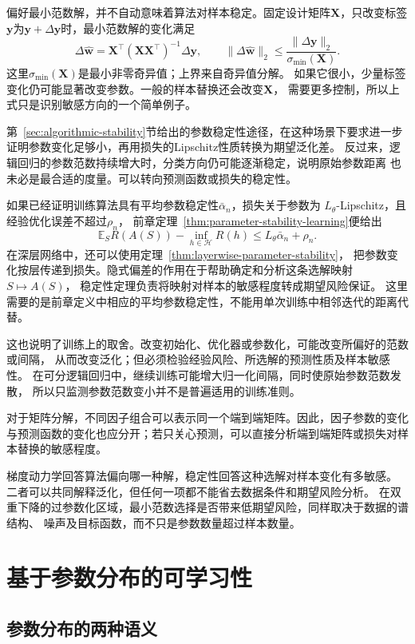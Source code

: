 偏好最小范数解，并不自动意味着算法对样本稳定。固定设计矩阵$\bm X$，只改变标签
$\bm y$为$\bm y+\Delta\bm y$时，最小范数解的变化满足
\[
 \Delta\hat{\bm w}=\bm X^\top(\bm X\bm X^\top)^{-1}\Delta\bm y,
 \qquad
 \|\Delta\hat{\bm w}\|_2\leq
 \frac{\|\Delta\bm y\|_2}{\sigma_{\min}(\bm X)}.
\]
这里$\sigma_{\min}(\bm X)$是最小非零奇异值；上界来自奇异值分解。
如果它很小，少量标签变化仍可能显著改变参数。一般的样本替换还会改变$\bm X$，
需要更多控制，所以上式只是识别敏感方向的一个简单例子。

第~\ref{sec:algorithmic-stability}节给出的参数稳定性途径，在这种场景下要求进一步
证明参数变化足够小，再用损失的Lipschitz性质转换为期望泛化差。
反过来，逻辑回归的参数范数持续增大时，分类方向仍可能逐渐稳定，说明原始参数距离
也未必是最合适的度量。可以转向预测函数或损失的稳定性。

如果已经证明训练算法具有平均参数稳定性$\bar\alpha_n$，损失关于参数为
$L_\theta$-Lipschitz，且经验优化误差不超过$\rho_n$，
前章定理~\ref{thm:parameter-stability-learning}便给出
\[
 \mathbb E_S R(A(S))-\inf_{h\in\mathcal H}R(h)
 \leq L_\theta\bar\alpha_n+\rho_n.
\]
在深层网络中，还可以使用定理~\ref{thm:layerwise-parameter-stability}，
把参数变化按层传递到损失。隐式偏差的作用在于帮助确定和分析这条选解映射$S\mapsto A(S)$，
稳定性定理负责将映射对样本的敏感程度转成期望风险保证。
这里需要的是前章定义中相应的平均参数稳定性，不能用单次训练中相邻迭代的距离代替。

这也说明了训练上的取舍。改变初始化、优化器或参数化，可能改变所偏好的范数或间隔，
从而改变泛化；但必须检验经验风险、所选解的预测性质及样本敏感性。
在可分逻辑回归中，继续训练可能增大归一化间隔，同时使原始参数范数发散，
所以只监测参数范数变小并不是普遍适用的训练准则。

对于矩阵分解，不同因子组合可以表示同一个端到端矩阵。因此，因子参数的变化与预测函数的变化也应分开；若只关心预测，可以直接分析端到端矩阵或损失对样本替换的敏感程度。

梯度动力学回答算法偏向哪一种解，稳定性回答这种选解对样本变化有多敏感。
二者可以共同解释泛化，但任何一项都不能省去数据条件和期望风险分析。
在双重下降的过参数化区域，最小范数选择是否带来低期望风险，同样取决于数据的谱结构、
噪声及目标函数，而不只是参数数量超过样本数量。

\section{基于参数分布的可学习性}
\label{sec:parameter-distributions}

\subsection{参数分布的两种语义}

